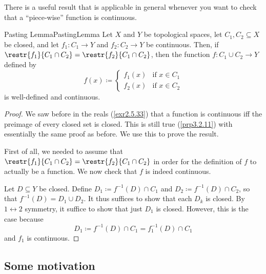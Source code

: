 There is a useful result that is applicable in general whenever you want to check that a ``piece-wise'' function is continuous.
\begin{prp}{Pasting Lemma}{PastingLemma}
Let $X$ and $Y$ be topological spaces, let $C_1,C_2\subseteq X$ be closed, and let $f_1:C_1\rightarrow Y$ and $f_2:C_2\rightarrow Y$ be continuous.  Then, if $\restr{f_1}{C_1\cap C_2}=\restr{f_2}{C_1\cap C_2}$, then the function $f\colon C_1\cup C_2\rightarrow Y$ defined by
\begin{equation}
f(x)\coloneqq \begin{cases}f_1(x) & \text{if }x\in C_1 \\ f_2(x) & \text{if }x\in C_2\end{cases}
\end{equation}
is well-defined and continuous.
\begin{proof}
We saw before in the reals (\cref{exr2.5.33}) that a function is continuous iff the preimage of every closed set is closed.  This is still true (\cref{prp3.2.11}) with essentially the same proof as before.  We use this to prove the result.

First of all, we needed to assume that $\restr{f_1}{C_1\cap C_2}=\restr{f_2}{C_1\cap C_2}$ in order for the definition of $f$ to actually be a function.  We now check that $f$ is indeed continuous.

Let $D\subseteq Y$ be closed.  Define $D_1\coloneqq f^{-1}(D)\cap C_1$ and $D_2\coloneqq f^{-1}(D)\cap C_2$, so that $f^{-1}(D)=D_1\cup D_2$.  It thus suffices to show that each $D_k$ is closed.  By $1\leftrightarrow 2$ symmetry, it suffice to show that just $D_1$ is closed.  However, this is the case because
\begin{equation}
D_1\coloneqq f^{-1}(D)\cap C_1=f_1^{-1}(D)\cap C_1
\end{equation}
and $f_1$ is continuous.
\end{proof}
\end{prp}

\subsection{Some motivation}

